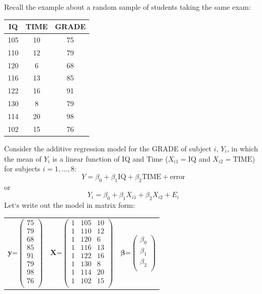 \documentclass{report}
\begin{document}
Recall the example about a random sample of students taking the same exam:
\begin{center}
\begin{tabular}{|c|c|c|} \hline
IQ & TIME & GRADE \\ \hline
105 & 10 & 75 \\
110 & 12 & 79 \\
120 & 6 & 68 \\
116 & 13 & 85 \\
122 & 16 & 91 \\
130 & 8 & 79 \\
114 & 20 & 98 \\
102 & 15 & 76 \\ \hline
\end{tabular}
\end{center}
\noindent
Consider the additive regression model for the GRADE of 
subject $i$, $Y_i$, in which the mean of $Y_i$ is a linear function of IQ and Time ($X_{i1}=\mbox{IQ}$ and $X_{i2}=\mbox{TIME}$) for subjects $i=1,\ldots,8$:
$$ Y = \beta_0 + \beta_1 \mbox{IQ} + \beta_2 \mbox{TIME} + \mbox{error}$$ 
or
$$ Y_i = \beta_0 + \beta_1 X_{i1} + \beta_2 X_{i2} + E_{i} $$ 
Let`s write out the model in matrix form:
\begin{center}
\begin{tabular}{ccc}
\textbf{y}=$\left(\begin{array}{c} 75 \\79\\68\\85\\91\\79\\98\\76\\\end{array}\right)$ &
\textbf{X}=$\left(\begin{array}{ccc}
1  &  105  &   10  \\
1  &  110  &   12  \\
1  &  120  &    6  \\
1  &  116  &   13  \\
1  &  122  &   16  \\
1  &  130  &    8  \\
1  &  114  &   20  \\
1  &  102  &   15  \\
\end{array}\right)$&
$\boldsymbol{\beta}$=$\left(\begin{array}{c} \beta_0 \\\beta_1\\\beta_2\\\end{array}\right)$ 
\end{tabular}
\end{center}
\end{document}
